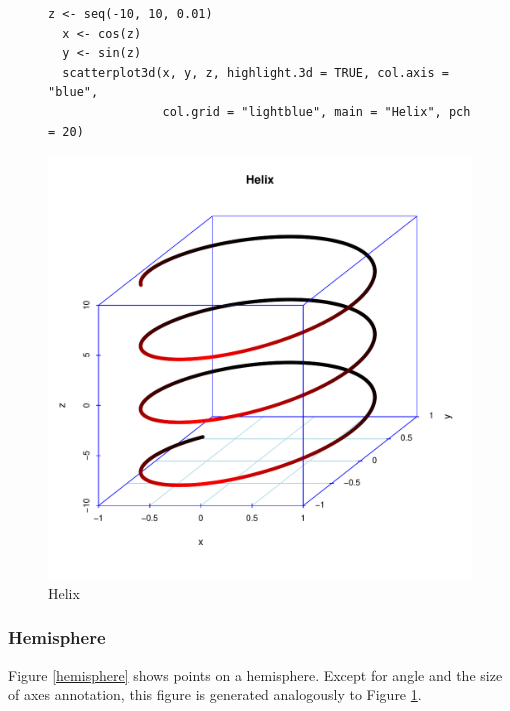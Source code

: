 \vspace*{10mm}
\begin{figure}[htb!]
\small
\begin{Verbatim}[frame=single]
  z <- seq(-10, 10, 0.01)
  x <- cos(z)
  y <- sin(z)
  scatterplot3d(x, y, z, highlight.3d = TRUE, col.axis = "blue",
                col.grid = "lightblue", main = "Helix", pch = 20)
\end{Verbatim}
\normalsize
\begin{center}
\includegraphics[width=13cm]{helix}
\end{center}
\vspace*{-10mm}\caption{Helix\label{helix}}
\end{figure}


\clearpage\subsubsection{Hemisphere}
Figure \ref{hemisphere} shows points on a hemisphere.
Except for  angle and the size of axes annotation, this figure is generated analogously to Figure \ref{helix}.

